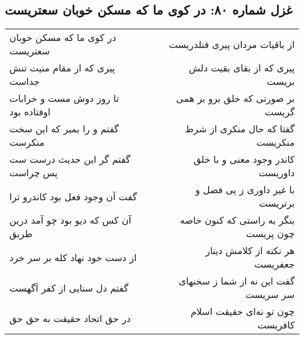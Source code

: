\begin{center}
\section*{غزل شماره ۸۰: در کوی ما که مسکن خوبان سعتریست}
\label{sec:080}
\begin{longtable}{l p{0.5cm} r}
در کوی ما که مسکن خوبان سعتریست
&&
از باقیات مردان پیری قنلدریست
\\
پیری که از مقام منیت تنش جداست
&&
پیری که از بقای بقیت دلش بریست
\\
تا روز دوش مست و خرابات اوفتاده بود
&&
بر صورتی که خلق برو بر همی گریست
\\
گفتم و را بمیر که این سخت منکرست
&&
گفتا که حال منکری از شرط منکریست
\\
گفتم گر این حدیث درست ست پس چراست
&&
کاندر وجود معنی و با خلق داوریست
\\
گفت آن وجود فعل بود کاندرو ترا
&&
با غیر داوری ز پی فضل و برتریست
\\
آن کس که دیو بود چو آمد درین طریق
&&
بنگر به راستی که کنون خاصه چون پریست
\\
از دست خود نهاد کله بر سر خرد
&&
هر نکته از کلامش دینار جعفریست
\\
گفتم دل سنایی از کفر آگهست
&&
گفت این نه از شما ز سخنهای سر سریست
\\
در حق اتحاد حقیقت به حق حق
&&
چون تو نه‌ای حقیقت اسلام کافریست
\\
\end{longtable}
\end{center}
